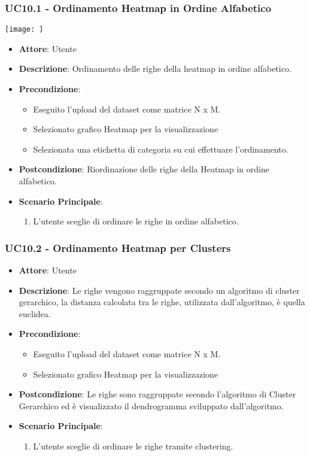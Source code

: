     \subsubsection{UC10.1 - Ordinamento Heatmap in Ordine Alfabetico}
    \label{uc10.1}
    \texttt{[image: ]}
    \begin{itemize}
    \item \textbf{Attore}: Utente
    \item \textbf{Descrizione}: Ordinamento delle righe della heatmap in ordine alfabetico.
    \item \textbf{Precondizione}: 
    \begin{itemize}
        \item Eseguito l'upload del dataset come matrice N x M.
        \item Selezionato grafico Heatmap per la visualizzazione
        \item Selezionata una etichetta di categoria su cui effettuare l'ordinamento.
    \end{itemize}  
    \item \textbf{Postcondizione}: Riordinazione delle righe della Heatmap in ordine alfabetico.
    \item \textbf{Scenario Principale}: 
    \begin{enumerate}
        \item L'utente sceglie di ordinare le righe in ordine alfabetico.
    \end{enumerate}  
    \end{itemize}
    
    \subsubsection{UC10.2 - Ordinamento Heatmap per Clusters}
    \label{uc10.2}
    \begin{itemize}
    \item \textbf{Attore}: Utente
    \item \textbf{Descrizione}: Le righe vengono raggruppate secondo un algoritmo di cluster gerarchico, la distanza calcolata  tra le righe, utilizzata dall'algoritmo, è quella euclidea.
    \item \textbf{Precondizione}: 
    \begin{itemize}
        \item Eseguito l'upload del dataset come matrice N x M.
        \item Selezionato grafico Heatmap per la visualizzazione
    \end{itemize}  
    \item \textbf{Postcondizione}: Le righe sono raggruppate secondo l'algoritmo di Cluster Gerarchico ed è visualizzato il dendrogramma sviluppato dall'algoritmo.
    \item \textbf{Scenario Principale}: 
    \begin{enumerate}
        \item L'utente sceglie di ordinare le righe tramite clustering.
    \end{enumerate}  
    \end{itemize}
    
